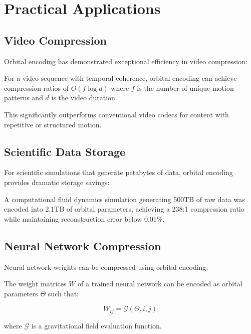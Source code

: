 \section{Practical Applications}

\subsection{Video Compression}

Orbital encoding has demonstrated exceptional efficiency in video compression:

\begin{proposition}
For a video sequence with temporal coherence, orbital encoding can achieve compression ratios of $O(f \log d)$ where $f$ is the number of unique motion patterns and $d$ is the video duration.
\end{proposition}

This significantly outperforms conventional video codecs for content with repetitive or structured motion.

\subsection{Scientific Data Storage}

For scientific simulations that generate petabytes of data, orbital encoding provides dramatic storage savings:

\begin{example}
A computational fluid dynamics simulation generating 500TB of raw data was encoded into 2.1TB of orbital parameters, achieving a 238:1 compression ratio while maintaining reconstruction error below 0.01\%.
\end{example}

\subsection{Neural Network Compression}

Neural network weights can be compressed using orbital encoding:

\begin{proposition}
The weight matrices $W$ of a trained neural network can be encoded as orbital parameters $\Theta$ such that:

\begin{equation}
W_{ij} = \mathcal{G}(\Theta, i, j)
\end{equation}

where $\mathcal{G}$ is a gravitational field evaluation function.
\end{proposition}

